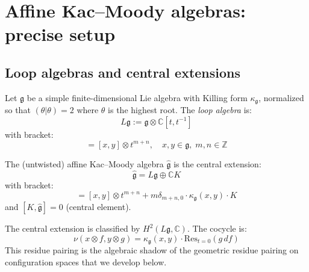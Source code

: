 \section{Affine Kac--Moody algebras: precise setup}

\subsection{Loop algebras and central extensions}

\begin{definition}\label{def:loop-algebra}
Let $\mathfrak{g}$ be a simple finite-dimensional Lie algebra with Killing form $\kappa_{\mathfrak{g}}$, normalized so that $(\theta|\theta) = 2$ where $\theta$ is the highest root. The \emph{loop algebra} is:
\begin{equation}
L\mathfrak{g} := \mathfrak{g} \otimes \mathbb{C}[t,t^{-1}]
\end{equation}
with bracket:
\begin{equation}
[x \otimes t^m, y \otimes t^n] = [x,y] \otimes t^{m+n}, \quad x,y \in \mathfrak{g}, \; m,n \in \mathbb{Z}
\end{equation}
\end{definition}

\begin{definition}\label{def:affine-kac-moody}
The (untwisted) affine Kac--Moody algebra $\widehat{\mathfrak{g}}$ is the central extension:
\begin{equation}
\widehat{\mathfrak{g}} = L\mathfrak{g} \oplus \mathbb{C} K
\end{equation}
with bracket:
\begin{equation}
[x \otimes t^m, y \otimes t^n] = [x,y] \otimes t^{m+n} + m \delta_{m+n,0} \cdot \kappa_{\mathfrak{g}}(x,y) \cdot K
\end{equation}
and $[K, \widehat{\mathfrak{g}}] = 0$ (central element).
\end{definition}

\begin{remark}
The central extension is classified by $H^2(L\mathfrak{g}, \mathbb{C})$. The cocycle is:
\begin{equation}
\nu(x \otimes f, y \otimes g) = \kappa_{\mathfrak{g}}(x,y) \cdot \mathrm{Res}_{t=0}(g \, df)
\end{equation}
This residue pairing is the algebraic shadow of the geometric residue pairing on configuration spaces that we develop below.
\end{remark}

